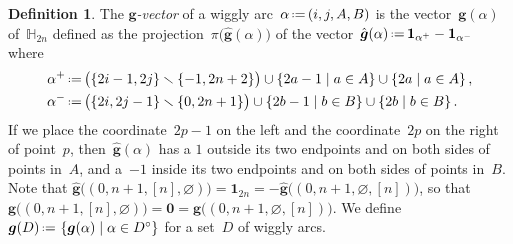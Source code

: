 \documentclass{amsart}
\theoremstyle{definition}
\newtheorem{definition}[theorem]{Definition}
\newcommand{\HH}{\mathbb{H}} %
\renewcommand{\b}[1]{{\boldsymbol{#1}}} %
\newcommand{\set}[2]{\left\{ #1 \;\middle|\; #2 \right\}} %
\newcommand{\ssm}{\smallsetminus} %
\newcommand{\one}{\b{1}} %
\newcommand{\eqdef}{\mbox{\,\raisebox{0.2ex}{\scriptsize\ensuremath{\mathrm:}}\ensuremath{=}\,}} %
\newcommand{\darkblue}{\color{darkblue}} %
\newcommand{\defn}[1]{\textsl{\darkblue #1}} %
\begin{document}
\begin{definition}
\label{def:gvectors}
The \defn{$\b{g}$-vector} of a wiggly arc~$\alpha \eqdef (i, j, A, B)$ is the vector~$\b{g}(\alpha)$ of~$\HH_{2n}$ defined as the projection~$\pi \big( \hat{\b{g}}(\alpha) \big)$ of the vector~$\hat{\b{g}}(\alpha) \eqdef \one_{\alpha^+} - \one_{\alpha^-}$ where
\begin{align*}
\alpha^+ & \eqdef \big(\{2i-1, 2j\} \ssm \{-1, 2n+2\} \big) \cup \set{2a-1}{a \in A} \cup \set{2a}{a \in A},
\\
\alpha^- & \eqdef \big(\{2i, 2j-1\} \ssm \{0, 2n+1\} \big) \cup \set{2b-1}{b \in B} \cup \set{2b}{b \in B}.
\end{align*}
If we place the coordinate~$2p-1$ on the left and the coordinate~$2p$ on the right of point~$p$, then~$\hat{\b{g}}(\alpha)$ has a $1$ outside its two endpoints and on both sides of points in~$A$, and a~$-1$ inside its two endpoints and on both sides of points in~$B$.
Note that ${\hat{\b{g}} \big( (0, n+1, [n], \varnothing) \big) = \one_{2n} = - \hat{\b{g}} \big( (0, n+1, \varnothing, [n]) \big)}$, so that~${\b{g} \big( (0, n+1, [n], \varnothing) \big) = \b{0} = \b{g} \big( (0, n+1, \varnothing, [n]) \big)}$.
We define~$\b{g}(D) \eqdef \set{\b{g}(\alpha)}{\alpha \in D^\circ}$ for a set~$D$ of wiggly arcs.
\end{definition}
\end{document}
